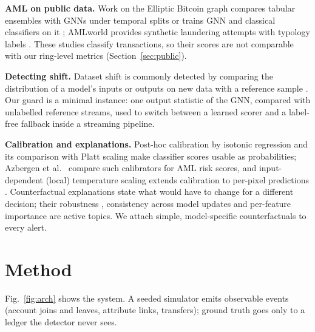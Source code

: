 \textbf{AML on public data.} Work on the Elliptic Bitcoin graph compares tabular
ensembles with GNNs under temporal splits \cite{badjie2026ensembles,kumar2026tagat}
or trains GNN and classical classifiers on it \cite{lu2026lagcn,shah2025aml}; AMLworld
provides synthetic laundering attempts with typology labels
\cite{altman2023amlworld}. These studies classify transactions, so their
scores are not comparable with our ring-level metrics
(Section~\ref{sec:public}).

\textbf{Detecting shift.} Dataset shift is commonly detected by comparing the
distribution of a model's inputs or outputs on new data with a reference sample
\cite{rabanser2019failing}. Our guard is a minimal instance: one output
statistic of the GNN, compared with unlabelled reference streams, used to switch
between a learned scorer and a label-free fallback inside a streaming pipeline.

\textbf{Calibration and explanations.} Post-hoc calibration by isotonic
regression \cite{zadrozny2002transforming} and its comparison with Platt
scaling \cite{niculescu2005predicting} make classifier scores usable as
probabilities; Azbergen et al.\ \cite{azbergen2026calibration} compare such
calibrators for AML risk scores, and input-dependent (local) temperature scaling
extends calibration to per-pixel predictions \cite{ding2021temperature}. Counterfactual explanations
state what would have to change for a different decision; their robustness
\cite{artelt2021robustness}, consistency across model updates
\cite{movin2025acdc} and per-feature importance \cite{meulemeester2026cfi} are
active topics. We attach simple, model-specific counterfactuals to every alert.

\section{Method}
\label{sec:method}
Fig.~\ref{fig:arch} shows the system. A seeded simulator emits observable
events (account joins and leaves, attribute links, transfers); ground truth
goes only to a ledger the detector never sees.

